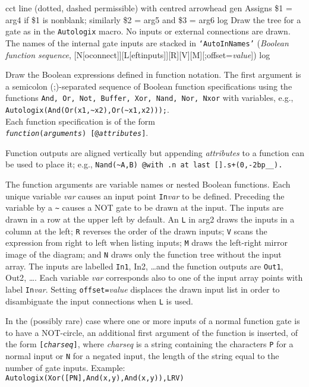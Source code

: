 %
  {cct}%
  {line (dotted, dashed permissible) with centred arrowhead
    }%
%
  {gen}%
  {Assigns \$1 = arg4 if \$1 is nonblank; similarly \$2 = arg5 and \$3 = arg6}%
%
  {log}%
  {Draw the tree for a gate as in the {\tt Autologix} macro.  No inputs
   or external connections are drawn.  The names of the internal gate
   inputs are stacked in {\tt `AutoInNames'}}%
%
 {({\sl Boolean function sequence},%
    [N[oconnect]][L[eftinputs]][R][V][M][;offset={\sl value}])}%
  {log}%
  {Draw the Boolean expressions defined in function notation.
   The first argument is a semicolon (;)-separated sequence of
   Boolean function specifications using the functions
   {\tt And, Or, Not, Buffer, Xor, Nand, Nor, Nxor}
   with variables, e.g.,
   {\tt Autologix(And(Or(x1,\~{}x2),Or(\~{}x1,x2)));}.\\
   Each function specification is of the form\\
   {\tt {\sl function}({\sl arguments}) [@{\sl attributes}]}.
   \par
   Function outputs are aligned vertically but appending
   {\tt@}{\sl attributes} to a function can be used to place it; e.g.,
   {\tt Nand(\~{}A,B) @with .n at last [].s+(0,-2bp\_\_).}
   \par
   The function arguments are variable names or nested Boolean functions.
   Each unique variable {\sl var} causes an input point {\tt In}{\sl var}
   to be defined.  Preceding the variable by a {\tt \~{}} causes a NOT gate
   to be drawn at the input.
   The inputs are drawn in a row at the upper left by default.
   An {\tt L} in arg2 draws the inputs in a column at the left;
   {\tt R} reverses the order of the drawn inputs;
   {\tt V} scans the expression from right to left
   when listing inputs;
   {\tt M} draws the left-right mirror image of the diagram;
   and {\tt N} draws only the function tree without the input array.
   The inputs are labelled {\tt In1}, {In2}, \ldots and the function
   outputs are {\tt Out1}, {Out2}, \dots.
   Each variable {\sl var} corresponds also to one of the input array
   points with label {\tt In}{\sl var}.
   Setting {\tt offset=}{\sl value} displaces the
   drawn input list in order to disambiguate the input connections when {\tt L}
   is used.
   \par
   In the (possibly rare) case where one or more inputs of a normal function
   gate is to have a NOT-circle, an additional first argument of the function
   is inserted, of the form {\tt [{\sl charseq}]}, where {\sl charseq}
   is a string containing the characters {\tt P} for a normal input or
   {\tt N} for a negated input, the length of the string equal to the number
   of gate inputs.  Example:
   {\tt Autologix(Xor([PN],And(x,y),And(x,y)),LRV)}}%

